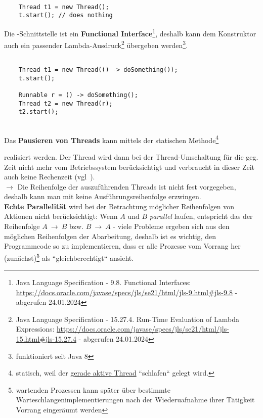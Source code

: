 \begin{verbatim}

    Thread t1 = new Thread();
    t.start(); // does nothing

\end{verbatim}


Die -Schnittstelle ist ein \textbf{Functional Interface}\footnote{
    Java Language Specification - 9.8. Functional Interfaces: \url{https://docs.oracle.com/javase/specs/jls/se21/html/jls-9.html#jls-9.8} - abgerufen 24.01.2024
}, deshalb kann dem Konstruktor auch ein passender Lambda-Ausdruck\footnote{
    Java Language Specification - 15.27.4. Run-Time Evaluation of Lambda Expressions: \url{https://docs.oracle.com/javase/specs/jls/se21/html/jls-15.html#jls-15.27.4}  - abgerufen 24.01.2024
} übergeben werden\footnote{funktioniert seit Java 8}.

\begin{verbatim}

    Thread t1 = new Thread(() -> doSomething());
    t.start();

    Runnable r = () -> doSomething();
    Thread t2 = new Thread(r);
    t2.start();

\end{verbatim}\\

Das \textbf{Pausieren von Threads} kann mittels der statischen Methode\footnote{
    statisch, weil der \ul{gerade aktive Thread} ``schlafen`` gelegt wird.
}
\begin{center}
 
\end{center}
realisiert werden.
Der Thread wird dann bei der Thread-Umschaltung für die geg. Zeit nicht mehr vom Betriebssystem berücksichtigt und verbraucht in dieser Zeit auch keine Rechenzeit (vgl~\cite[16]{Oec22}).\\

$\rightarrow$ Die Reihenfolge der auszuführenden Threads ist nicht fest vorgegeben, deshalb kann man mit  keine Ausführungsreihenfolge erzwingen.\\

\textbf{Echte Parallelität} wird bei der Betrachtung möglicher Reihenfolgen von Aktionen nicht berücksichtigt: Wenn $A$ und $B$ \textit{parallel} laufen, entspricht das der Reihenfolge $A\ \rightarrow\ B$ bzw. $B\ \rightarrow\ A$ - viele Probleme ergeben sich aus den möglichen Reihenfolgen der Abarbeitung, deshalb ist es wichtig, den Programmcode so zu implementieren, dass er alle Prozesse vom Vorrang her (zunächst)\footnote{
wartenden Prozessen kann später über bestimmte Warteschlangenimplementierungen nach der Wiederuafnahme ihrer Tätigkeit Vorrang eingeräumt werden
} als ``gleichberechtigt`` ansieht.

